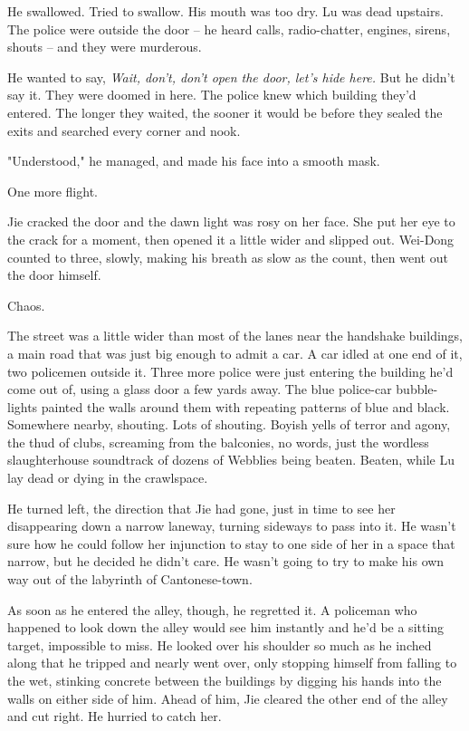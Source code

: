 He swallowed. Tried to swallow. His mouth was too dry. Lu was dead
upstairs. The police were outside the door -- he heard calls,
radio-chatter, engines, sirens, shouts -- and they were murderous.

He wanted to say,
\emph{Wait, don't, don't open the door, let's hide here.} But he
didn't say it. They were doomed in here. The police knew which
building they'd entered. The longer they waited, the sooner it
would be before they sealed the exits and searched every corner and
nook.

"Understood," he managed, and made his face into a smooth mask.

One more flight.

Jie cracked the door and the dawn light was rosy on her face. She
put her eye to the crack for a moment, then opened it a little
wider and slipped out. Wei-Dong counted to three, slowly, making
his breath as slow as the count, then went out the door himself.

Chaos.

The street was a little wider than most of the lanes near the
handshake buildings, a main road that was just big enough to admit
a car. A car idled at one end of it, two policemen outside it.
Three more police were just entering the building he'd come out of,
using a glass door a few yards away. The blue police-car
bubble-lights painted the walls around them with repeating patterns
of blue and black. Somewhere nearby, shouting. Lots of shouting.
Boyish yells of terror and agony, the thud of clubs, screaming from
the balconies, no words, just the wordless slaughterhouse
soundtrack of dozens of Webblies being beaten. Beaten, while Lu lay
dead or dying in the crawlspace.

He turned left, the direction that Jie had gone, just in time to
see her disappearing down a narrow laneway, turning sideways to
pass into it. He wasn't sure how he could follow her injunction to
stay to one side of her in a space that narrow, but he decided he
didn't care. He wasn't going to try to make his own way out of the
labyrinth of Cantonese-town.

As soon as he entered the alley, though, he regretted it. A
policeman who happened to look down the alley would see him
instantly and he'd be a sitting target, impossible to miss. He
looked over his shoulder so much as he inched along that he tripped
and nearly went over, only stopping himself from falling to the
wet, stinking concrete between the buildings by digging his hands
into the walls on either side of him. Ahead of him, Jie cleared the
other end of the alley and cut right. He hurried to catch her.

